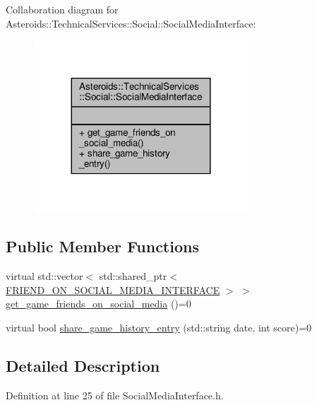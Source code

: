 Collaboration diagram for Asteroids\+:\+:Technical\+Services\+:\+:Social\+:\+:Social\+Media\+Interface\+:\nopagebreak
\begin{figure}[H]
\begin{center}
\leavevmode
\includegraphics[width=227pt]{classAsteroids_1_1TechnicalServices_1_1Social_1_1SocialMediaInterface__coll__graph}
\end{center}
\end{figure}
\subsection*{Public Member Functions}
\begin{DoxyCompactItemize}
\item 
virtual std\+::vector$<$ std\+::shared\+\_\+ptr$<$ \hyperlink{classAsteroids_1_1TechnicalServices_1_1Social_1_1FRIEND__ON__SOCIAL__MEDIA__INTERFACE}{F\+R\+I\+E\+N\+D\+\_\+\+O\+N\+\_\+\+S\+O\+C\+I\+A\+L\+\_\+\+M\+E\+D\+I\+A\+\_\+\+I\+N\+T\+E\+R\+F\+A\+CE} $>$ $>$ \hyperlink{classAsteroids_1_1TechnicalServices_1_1Social_1_1SocialMediaInterface_ad0e1bf4bcb33be433c445ac633e793d8}{get\+\_\+game\+\_\+friends\+\_\+on\+\_\+social\+\_\+media} ()=0
\item 
virtual bool \hyperlink{classAsteroids_1_1TechnicalServices_1_1Social_1_1SocialMediaInterface_ac86872ff7126501fd369b27bfdf3895c}{share\+\_\+game\+\_\+history\+\_\+entry} (std\+::string date, int score)=0
\end{DoxyCompactItemize}


\subsection{Detailed Description}


Definition at line 25 of file Social\+Media\+Interface.\+h.



